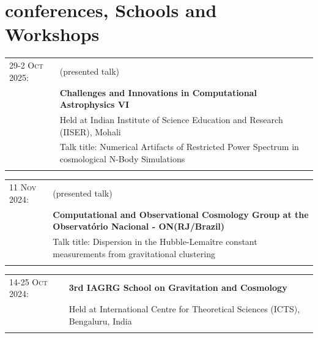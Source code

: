 \documentclass[a4paper,10pt]{article}
\begin{document}
\section{conferences, Schools and Workshops}

\begin{tabular}{p{2.5cm} p{11cm}}

\textsc{29-2 Oct 2025:} & {(presented talk)}\\ 
& \textbf{{Challenges and Innovations in Computational Astrophysics VI} }\\
& \footnotesize{Held at Indian Institute of Science Education and Research (IISER), Mohali}\\
& \footnotesize{Talk title: Numerical Artifacts of Restricted Power Spectrum in cosmological N-Body Simulations}\\ \\
\end{tabular}

\begin{tabular}{p{2.5cm} p{11cm}}

\textsc{11 Nov 2024:} & {(presented talk)}\\ 
& \textbf{{Computational and Observational Cosmology Group at the Observat\'orio Nacional - ON(RJ/Brazil)} }\\
& \footnotesize{Talk title: Dispersion in the Hubble-Lema\^itre constant measurements from gravitational clustering}\\ \\
\end{tabular}


\begin{tabular}{p{2.5cm} p{11cm}}
\textsc{14-25 Oct 2024:} & \textbf{{3rd IAGRG School on Gravitation and Cosmology} }\\
& \footnotesize{Held at International Centre for Theoretical Sciences (ICTS), Bengaluru, India}\\ \\
\end{tabular}
\end{document}
